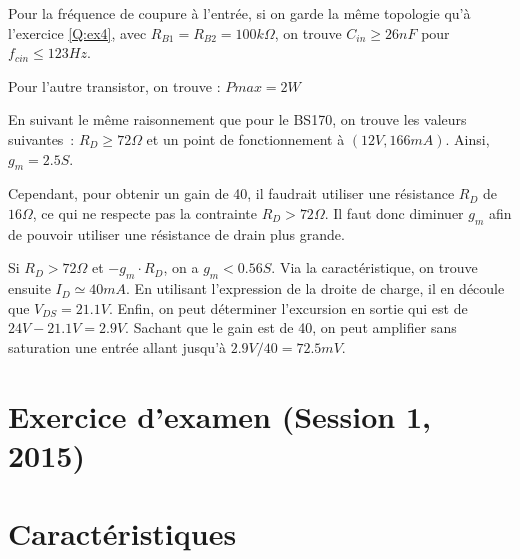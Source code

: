 \documentclass{../template/tp}
\begin{document}
{%

Pour la fréquence de coupure à l'entrée, si on garde la même topologie qu'à l'exercice \ref{Q:ex4}, avec $R_{B1}=R_{B2}=100k\Omega$, on trouve $C_{in}\geq 26nF$ pour $f_{cin}\leq 123Hz$.

Pour l'autre transistor, on trouve :
$Pmax=2W$

En suivant le même raisonnement que pour le BS170, on trouve les valeurs suivantes~: $R_D\geq 72\Omega$ et un point de fonctionnement à $(12V, 166mA)$.
Ainsi, $g_m=2.5S$.

Cependant, pour obtenir un gain de 40, il faudrait utiliser une résistance $R_D$ de $16 \Omega$, ce qui ne respecte pas la contrainte $R_D > 72 \Omega$. Il faut donc diminuer $g_m$ afin de pouvoir utiliser une résistance de drain plus grande.

Si $R_D > 72 \Omega$ et $-g_m \cdot R_D$, on a $g_m < 0.56 S$.
Via la caractéristique, on trouve ensuite $I_D\simeq 40mA$.
En utilisant l'expression de la droite de charge, il en découle que $V_{DS} = 21.1 V$.
Enfin, on peut déterminer l'excursion en sortie qui est de $24 V - 21.1V = 2.9 V$.
Sachant que le gain est de 40, on peut amplifier sans saturation une entrée allant jusqu'à $2.9 V / 40 = 72.5 mV$.


}

\newpage
\section{Exercice d'examen (Session 1, 2015)}

\appendix
\vspace*{-3cm}
\section{Caractéristiques}
\end{document}
